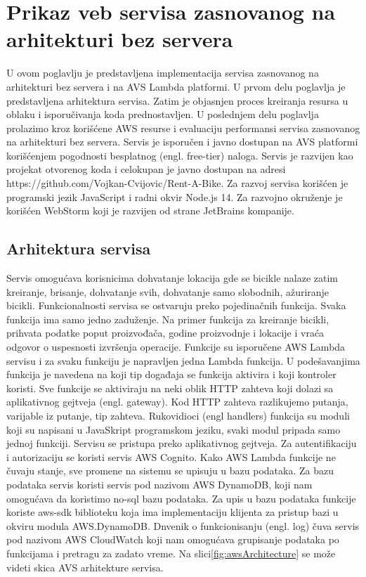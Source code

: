 \documentclass[12pt,oneside]{memoir}
\begin{document}
\chapter{Prikaz veb servisa zasnovanog na arhitekturi bez servera}
 
U ovom poglavlju je predstavljena implementacija servisa zasnovanog na arhitekturi bez servera i na AVS Lambda platformi. U prvom delu poglavlja je predstavljena arhitektura servisa. Zatim je objasnjen proces kreiranja resursa u oblaku i isporučivanja koda prednostavljen. U poslednjem delu poglavlja prolazimo kroz korišćene AWS resurse i evaluaciju performansi servisa zasnovanog na arhitekturi bez servera. Servis je isporučen i javno dostupan na AVS platformi korišćenjem pogodnosti besplatnog (engl. free-tier) naloga. Servis je razvijen kao projekat otvorenog koda i celokupan je javno dostupan na adresi https://github.com/Vojkan-Cvijovic/Rent-A-Bike. Za razvoj servisa korišćen je programski jezik JavaScript i radni okvir Node.js 14. Za razvojno okruženje je korišćen WebStorm koji je razvijen od strane JetBrains kompanije.
\section{Arhitektura servisa}
Servis omogućava korisnicima dohvatanje lokacija gde se bicikle nalaze zatim kreiranje, brisanje, dohvatanje svih, dohvatanje samo slobodnih, ažuriranje bicikli. Funkcionalnosti servisa se ostvaruju preko pojedinačnih funkcija. Svaka funkcija ima samo jedno zaduženje. Na primer funkcija za kreiranje bicikli, prihvata podatke poput proizvođača, godine proizvodnje i lokacije i vraća odgovor o uspesnosti izvršenja operacije. Funkcije su isporučene AWS Lambda servisu i za svaku funkciju je napravljen jedna Lambda funkcija. U podešavanjima funkcija je navedena na koji tip događaja se funkcija aktivira i koji kontroler koristi. Sve funkcije se aktiviraju na neki oblik HTTP zahteva koji dolazi sa aplikativnog gejtveja (engl. gateway). Kod HTTP zahteva razlikujemo putanja, varijable iz putanje, tip zahteva. Rukovidioci (engl handlers) funkcija su moduli koji su napisani u JavaSkript programskom jeziku, svaki modul pripada samo jednoj funkciji. Servisu se pristupa preko aplikativnog gejtveja. Za autentifikaciju i autorizaciju se koristi servis AWS Cognito. Kako AWS Lambda funkcije ne čuvaju stanje, sve promene na sistemu se upisuju u bazu podataka. Za bazu podataka servis koristi servis pod nazivom AWS DynamoDB, koji nam omogućava da koristimo no-sql bazu podataka. Za upis u bazu podataka funkcije koriste aws-sdk biblioteku koja ima implementaciju klijenta za pristup bazi u okviru modula AWS.DynamoDB. Dnvenik o funkcionisanju (engl. log) čuva servis pod nazivom AWS CloudWatch koji nam omogućava grupisanje podataka po funkcijama i pretragu za zadato vreme. Na slici\ref{fig:awsArchitecture} se može videti skica AVS arhitekture servisa.
\end{document}
